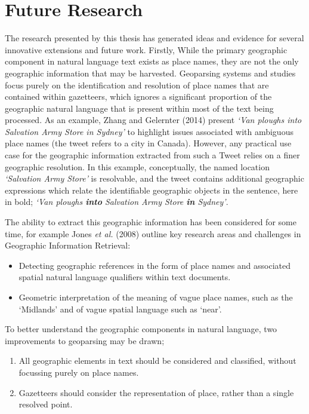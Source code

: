 \documentclass[
  letterpaper,
  11pt,
  english,
  onehalfspacing,
  headsepline]{MastersDoctoralThesis}
\providecommand{\tightlist}{%
  \setlength{\itemsep}{0pt}\setlength{\parskip}{0pt}}\usepackage{longtable,booktabs,array}
\begin{document}
\hypertarget{sec-futurework}{%
\section{Future Research}\label{sec-futurework}}

The research presented by this thesis has generated ideas and evidence
for several innovative extensions and future work. Firstly, While the
primary geographic component in natural language text exists as place
names, they are not the only geographic information that may be
harvested. Geoparsing systems and studies focus purely on the
identification and resolution of place names that are contained within
gazetteers, which ignores a significant proportion of the geographic
natural language that is present within most of the text being
processed. As an example, Zhang and Gelernter (2014) present \emph{`Van
ploughs into Salvation Army Store in Sydney'} to highlight issues
associated with ambiguous place names (the tweet refers to a city in
Canada). However, any practical use case for the geographic information
extracted from such a Tweet relies on a finer geographic resolution. In
this example, conceptually, the named location \emph{`Salvation Army
Store'} is resolvable, and the tweet contains additional geographic
expressions which relate the identifiable geographic objects in the
sentence, here in bold; \emph{`Van ploughs \textbf{into} Salvation Army
Store \textbf{in} Sydney'}.

The ability to extract this geographic information has been considered
for some time, for example Jones \emph{et al.} (2008) outline key
research areas and challenges in Geographic Information Retrieval:

\begin{itemize}
\tightlist
\item
  Detecting geographic references in the form of place names and
  associated spatial natural language qualifiers within text documents.
\item
  Geometric interpretation of the meaning of vague place names, such as
  the `Midlands' and of vague spatial language such as `near'.
\end{itemize}

To better understand the geographic components in natural language, two
improvements to geoparsing may be drawn;

\begin{enumerate}
\def\labelenumi{\arabic{enumi}.}
\item
  All geographic elements in text should be considered and classified,
  without focussing purely on place names.
\item
  Gazetteers should consider the representation of place, rather than a
  single resolved point.
\end{enumerate}
\end{document}
